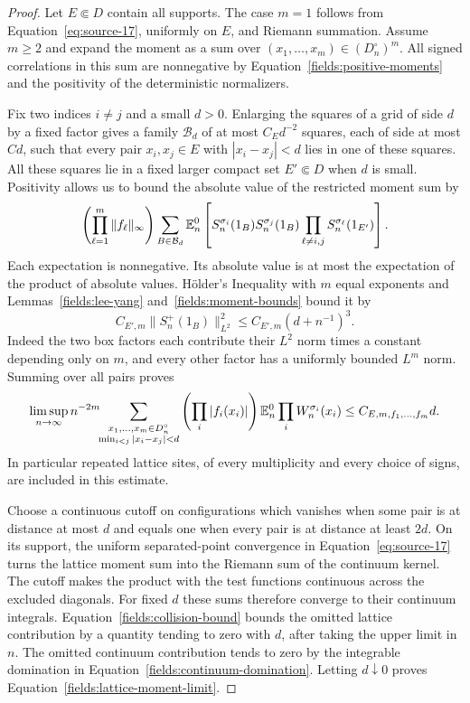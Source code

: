 \begin{proof}
Let $E\Subset D$ contain all supports.  The case $m=1$
follows from Equation~\eqref{eq:source-17}, uniformly on $E$,
and Riemann summation.  Assume $m\geq2$ and expand the moment
as a sum over $(x_1,\ldots,x_m)\in(D_n^\circ)^m$.
All signed correlations in this sum are nonnegative by
Equation~\eqref{fields:positive-moments} and the positivity
of the deterministic normalizers.

Fix two indices $i\ne j$ and a small $d>0$.  Enlarging the squares
of a grid of side $d$ by a fixed factor gives a family
$\mathcal B_d$ of at most $C_Ed^{-2}$ squares, each of side
at most $C d$, such that every pair $x_i,x_j\in E$ with
$|x_i-x_j|<d$ lies in one of these squares.  All these squares
lie in a fixed larger compact set $E'\Subset D$ when $d$
is small.  Positivity allows us to bound the absolute value
of the restricted moment sum by
\[
 \left(\prod_{\ell=1}^m\|f_\ell\|_\infty\right)
 \sum_{B\in\mathcal B_d}
 \mathbb E_n^0\left[
     S_n^{\sigma_i}(1_B)S_n^{\sigma_j}(1_B)
       \prod_{\ell\ne i,j}S_n^{\sigma_\ell}(1_{E'})
       \right].
\]
Each expectation is nonnegative.  Its absolute value is at
most the expectation of the product of absolute values.
H\"older's Inequality with $m$ equal exponents and
Lemmas~\ref{fields:lee-yang} and~\ref{fields:moment-bounds} bound it by
\[
 C_{E',m}
 \|S_n^+(1_B)\|_{L^2}^2
 \leq C_{E',m}(d+n^{-1})^3.
\]
Indeed the two box factors each contribute their
$L^2$ norm times a constant depending only on $m$, and
every other factor has a uniformly bounded $L^m$ norm.
Summing over all pairs proves
\begin{equation}\label{fields:collision-bound}
 \limsup_{n\to\infty}
 n^{-2m}\!\!\sum_{\substack{x_1,\ldots,x_m\in D_n^\circ\\
                    \min_{i<j}|x_i-x_j|<d}}
 \left(\prod_i|f_i(x_i)|\right)
          \mathbb E_n^0\prod_i W_n^{\sigma_i}(x_i)
 \leq C_{E,m,f_1,\ldots,f_m}d.
\end{equation}
In particular repeated lattice sites, of every multiplicity
and every choice of signs, are included in this estimate.

Choose a continuous cutoff on configurations which vanishes
when some pair is at distance at most $d$ and equals one
when every pair is at distance at least $2d$.
On its support, the uniform separated-point convergence in
Equation~\eqref{eq:source-17} turns the lattice moment sum
into the Riemann sum of the continuum kernel.
The cutoff makes the product with the test functions continuous
across the excluded diagonals.  For fixed $d$ these sums
therefore converge to their continuum integrals.
Equation~\eqref{fields:collision-bound} bounds the omitted
lattice contribution by a quantity tending to zero with $d$,
after taking the upper limit in $n$.
The omitted continuum contribution tends to zero by the
integrable domination in
Equation~\eqref{fields:continuum-domination}.
Letting $d\downarrow0$ proves
Equation~\eqref{fields:lattice-moment-limit}.
\end{proof}

